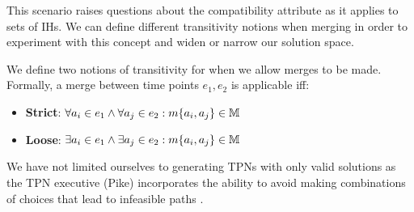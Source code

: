 This scenario raises questions about the compatibility attribute as it applies to sets of IHs. We can define different transitivity notions when merging in order to experiment with this concept and widen or narrow our solution space.
\begin{definition} 
    We define two notions of transitivity for when we allow merges to be made.
    Formally, a merge between time points $e_1,e_2$ is applicable iff:
    \begin{itemize}
        \item \textbf{Strict}: $\forall a_i \in e_1 \wedge \forall a_j \in e_2:   m\{a_i,a_j\} \in \mathbb{M}$ 
        \item \textbf{Loose}: $\exists a_i \in e_1 \wedge \exists a_j \in e_2: m\{a_i,a_j\} \in \mathbb{M}$
    \end{itemize}
\end{definition}

We have not limited ourselves to generating TPNs with only valid solutions as the TPN executive (Pike) incorporates the ability to avoid making combinations of choices that lead to infeasible paths \cite{levine2018watching}.

